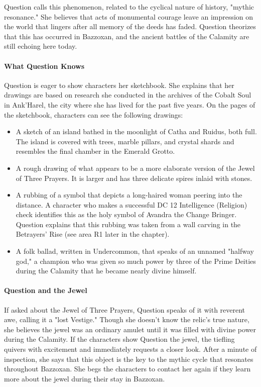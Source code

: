 \documentclass[10pt,a4,twoside,twocolumn,openany,nodeprecatedcode]{dndbook}
\begin{document}
Question calls this phenomenon, related to the cyclical nature of history, "mythic resonance." She believes that acts of monumental courage leave an impression on the world that lingers after all memory of the deeds has faded. Question theorizes that this has occurred in Bazzoxan, and the ancient battles of the Calamity are still echoing here today.
\paragraph{What Question Knows}
Question is eager to show characters her sketchbook. She explains that her drawings are based on research she conducted in the archives of the Cobalt Soul in Ank'Harel, the city where she has lived for the past five years. On the pages of the sketchbook, characters can see the following drawings:
\begin{itemize}

\item A sketch of an island bathed in the moonlight of Catha and Ruidus, both full. The island is covered with trees, marble pillars, and crystal shards and resembles the final chamber in the Emerald Grotto.
\item A rough drawing of what appears to be a more elaborate version of the Jewel of Three Prayers. It is larger and has three delicate spires inlaid with stones.
\item A rubbing of a symbol that depicts a long-haired woman peering into the distance. A character who makes a successful DC 12 Intelligence (Religion) check identifies this as the holy symbol of Avandra the Change Bringer. Question explains that this rubbing was taken from a wall carving in the Betrayers' Rise (see area R1 later in the chapter).
\item A folk ballad, written in Undercommon, that speaks of an unnamed "halfway god," a champion who was given so much power by three of the Prime Deities during the Calamity that he became nearly divine himself.
\end{itemize}


\paragraph{Question and the Jewel}
If asked about the Jewel of Three Prayers, Question speaks of it with reverent awe, calling it a "lost Vestige." Though she doesn't know the relic's true nature, she believes the jewel was an ordinary amulet until it was filled with divine power during the Calamity.
If the characters show Question the jewel, the tiefling quivers with excitement and immediately requests a closer look. After a minute of inspection, she says that this object is the key to the mythic cycle that resonates throughout Bazzoxan. She begs the characters to contact her again if they learn more about the jewel during their stay in Bazzoxan.
\end{document}
